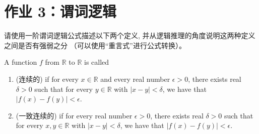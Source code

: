 
\newpage
\section{作业 3：谓词逻辑}

\begin{problem}
  请使用一阶谓词逻辑公式描述以下两个定义,
  并从逻辑推理的角度说明这两种定义之间是否有强弱之分
  （可以使用``重言式''进行公式转换）。

  A function $f$ from $\mathbb{R}$ to $\mathbb{R}$ is called
  \begin{enumerate}[(1)]
    \setlength{\itemsep}{10pt}
    \item {} (连续的) if
      for every $x \in \mathbb{R}$
      and every real number $\epsilon > 0$,
      there exists real $\delta > 0$ such that
      for every $y \in \mathbb{R}$ with $|x - y| < \delta$,
      we have that $|f(x) -  f(y)|< \epsilon$.
    \item {} (一致连续的) if
      for every real number $\epsilon > 0$,
      there exists real $\delta > 0$ such that
      for every $x, y \in \mathbb{R}$ with $|x - y| < \delta$,
      we have that $|f(x) -  f(y)|< \epsilon$.
  \end{enumerate}
\end{problem}

